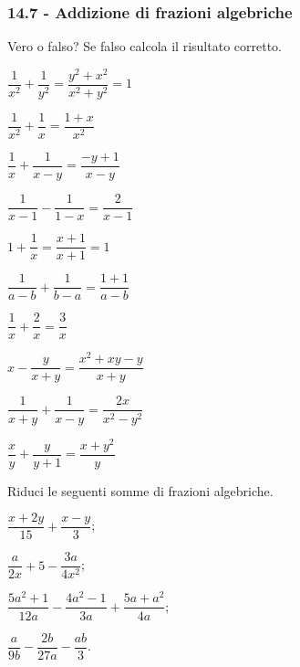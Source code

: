 \subsubsection*{14.7 - Addizione di frazioni algebriche}

\begin{esercizio}
\label{ese:14.22}
Vero o falso? Se falso calcola il risultato corretto.
\begin{multicols}{2}
\TabPositions{4cm}
\begin{enumeratea}
 \item $\dfrac{1}{x^{2}}+\dfrac{1}{y^{2}}=\dfrac{y^{2}+x^{2}}{x^{2}+y^{2}}=1$ \tab\boxV\quad\boxF
 \item $\dfrac{1}{x^{2}}+\dfrac{1}{x}=\dfrac{1+x}{x^{2}}$ \tab\boxV\quad\boxF
 \item $\dfrac{1}{x}+\dfrac{1}{x-y}=\dfrac{-y+1}{x-y}$ \tab\boxV\quad\boxF
 \item $\dfrac{1}{x-1}-\dfrac{1}{1-x}=\dfrac{2}{x-1}$ \tab\boxV\quad\boxF
 \item $1+\dfrac{1}{x}=\dfrac{x+1}{x+1}=1$ \tab\boxV\quad\boxF
 \item $\dfrac{1}{a-b}+\dfrac{1}{b-a}=\dfrac{1+1}{a-b}$ \tab\boxV\quad\boxF
 \item $\dfrac{1}{x}+\dfrac{2}{x}=\dfrac{3}{x}$ \tab\boxV\quad\boxF
 \item $x-\dfrac{y}{x+y}=\dfrac{x^{2}+xy-y}{x+y}$ \tab\boxV\quad\boxF
 \item $\dfrac{1}{x+y}+\dfrac{1}{x-y}=\dfrac{2x}{x^{2}-y^{2}}$ \tab\boxV\quad\boxF
 \item $\dfrac{x}{y}+\dfrac{y}{y+1}=\dfrac{x+y^{2}}{y}$ \tab\boxV\quad\boxF
\end{enumeratea}
\end{multicols}
\end{esercizio}
\pagebreak
\begin{esercizio}[\Ast]
\label{ese:14.23}
Riduci le seguenti somme di frazioni algebriche.
\begin{multicols}{2}
\begin{enumeratea}
 \item $\dfrac{x+2y}{15}+\dfrac{x-y}{3}$;
 \item $\dfrac{a}{2x}+5-\dfrac{3a}{4x^{2}}$;
 \item $\dfrac{5a^{2}+1}{12a}-\dfrac{4a^{2}-1}{3a}+\dfrac{5a+a^{2}}{4a}$;
 \item $\dfrac{a}{9b}-\dfrac{2b}{27a}-\dfrac{ab}{3}$.
\end{enumeratea}
\end{multicols}
\end{esercizio}

